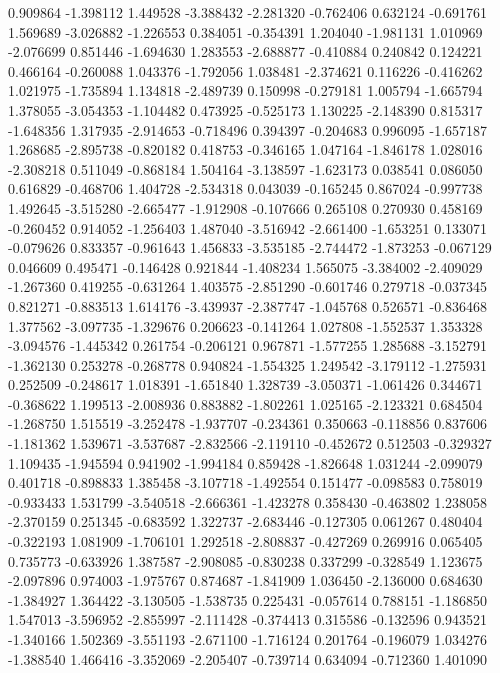 0.909864
-1.398112
1.449528
-3.388432
-2.281320
-0.762406
0.632124
-0.691761
1.569689
-3.026882
-1.226553
0.384051
-0.354391
1.204040
-1.981131
1.010969
-2.076699
0.851446
-1.694630
1.283553
-2.688877
-0.410884
0.240842
0.124221
0.466164
-0.260088
1.043376
-1.792056
1.038481
-2.374621
0.116226
-0.416262
1.021975
-1.735894
1.134818
-2.489739
0.150998
-0.279181
1.005794
-1.665794
1.378055
-3.054353
-1.104482
0.473925
-0.525173
1.130225
-2.148390
0.815317
-1.648356
1.317935
-2.914653
-0.718496
0.394397
-0.204683
0.996095
-1.657187
1.268685
-2.895738
-0.820182
0.418753
-0.346165
1.047164
-1.846178
1.028016
-2.308218
0.511049
-0.868184
1.504164
-3.138597
-1.623173
0.038541
0.086050
0.616829
-0.468706
1.404728
-2.534318
0.043039
-0.165245
0.867024
-0.997738
1.492645
-3.515280
-2.665477
-1.912908
-0.107666
0.265108
0.270930
0.458169
-0.260452
0.914052
-1.256403
1.487040
-3.516942
-2.661400
-1.653251
0.133071
-0.079626
0.833357
-0.961643
1.456833
-3.535185
-2.744472
-1.873253
-0.067129
0.046609
0.495471
-0.146428
0.921844
-1.408234
1.565075
-3.384002
-2.409029
-1.267360
0.419255
-0.631264
1.403575
-2.851290
-0.601746
0.279718
-0.037345
0.821271
-0.883513
1.614176
-3.439937
-2.387747
-1.045768
0.526571
-0.836468
1.377562
-3.097735
-1.329676
0.206623
-0.141264
1.027808
-1.552537
1.353328
-3.094576
-1.445342
0.261754
-0.206121
0.967871
-1.577255
1.285688
-3.152791
-1.362130
0.253278
-0.268778
0.940824
-1.554325
1.249542
-3.179112
-1.275931
0.252509
-0.248617
1.018391
-1.651840
1.328739
-3.050371
-1.061426
0.344671
-0.368622
1.199513
-2.008936
0.883882
-1.802261
1.025165
-2.123321
0.684504
-1.268750
1.515519
-3.252478
-1.937707
-0.234361
0.350663
-0.118856
0.837606
-1.181362
1.539671
-3.537687
-2.832566
-2.119110
-0.452672
0.512503
-0.329327
1.109435
-1.945594
0.941902
-1.994184
0.859428
-1.826648
1.031244
-2.099079
0.401718
-0.898833
1.385458
-3.107718
-1.492554
0.151477
-0.098583
0.758019
-0.933433
1.531799
-3.540518
-2.666361
-1.423278
0.358430
-0.463802
1.238058
-2.370159
0.251345
-0.683592
1.322737
-2.683446
-0.127305
0.061267
0.480404
-0.322193
1.081909
-1.706101
1.292518
-2.808837
-0.427269
0.269916
0.065405
0.735773
-0.633926
1.387587
-2.908085
-0.830238
0.337299
-0.328549
1.123675
-2.097896
0.974003
-1.975767
0.874687
-1.841909
1.036450
-2.136000
0.684630
-1.384927
1.364422
-3.130505
-1.538735
0.225431
-0.057614
0.788151
-1.186850
1.547013
-3.596952
-2.855997
-2.111428
-0.374413
0.315586
-0.132596
0.943521
-1.340166
1.502369
-3.551193
-2.671100
-1.716124
0.201764
-0.196079
1.034276
-1.388540
1.466416
-3.352069
-2.205407
-0.739714
0.634094
-0.712360
1.401090
